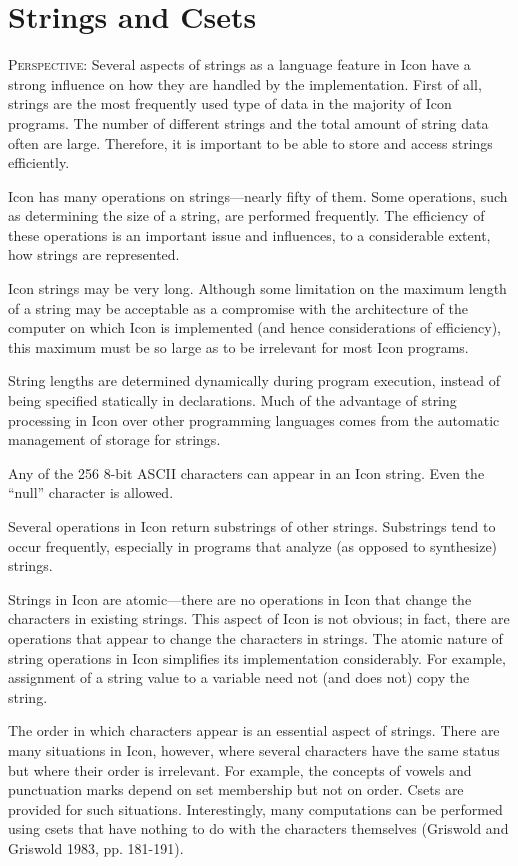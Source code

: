 \chapter{Strings and Csets}

\textsc{Perspective}: Several aspects of strings as a language feature
in Icon have a strong influence on how they are handled by the
implementation. First of all, strings are the most frequently used
type of data in the majority of Icon programs. The number of different
strings and the total amount of string data often are
large. Therefore, it is important to be able to store and access
strings efficiently.

Icon has many operations on strings---nearly fifty of them. Some
operations, such as determining the size of a string, are performed
frequently. The efficiency of these operations is an important issue
and influences, to a considerable extent, how strings are represented.

Icon strings may be very long. Although some limitation on the maximum
length of a string may be acceptable as a compromise with the
architecture of the computer on which Icon is implemented (and hence
considerations of efficiency), this maximum must be so large as to be
irrelevant for most Icon programs.

String lengths are determined dynamically during program execution,
instead of being specified statically in declarations. Much of the
advantage of string processing in Icon over other programming
languages comes from the automatic management of storage for strings.

Any of the 256 8-bit ASCII characters can appear in an Icon
string. Even the ``null'' character is allowed.

Several operations in Icon return substrings of other
strings. Substrings tend to occur frequently, especially in programs
that analyze (as opposed to synthesize) strings.


Strings in Icon are atomic---there are no operations in Icon that
change the characters in existing strings. This aspect of Icon is not
obvious; in fact, there are operations that appear to change the
characters in strings. The atomic nature of string operations in Icon
simplifies its implementation considerably. For example, assignment of
a string value to a variable need not (and does not) copy the string.

The order in which characters appear is an essential aspect of
strings. There are many situations in Icon, however, where several
characters have the same status but where their order is
irrelevant. For example, the concepts of vowels and punctuation marks
depend on set membership but not on order. Csets are provided for such
situations. Interestingly, many computations can be performed using
csets that have nothing to do with the characters themselves (Griswold
and Griswold 1983, pp. 181-191).


